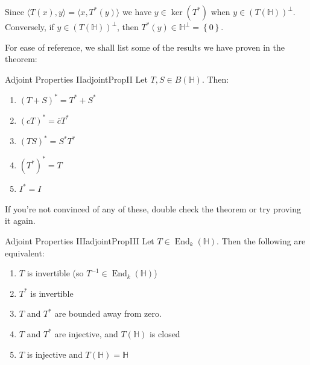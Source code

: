 \documentclass[oneside]{book}
\renewcommand{\H}{\mathbb{H}}
\newcommand{\oln}{\overline}
\newcommand{\End}{\operatorname{End}}
\begin{document}
\begin{Proof}
	Since $ \langle T(x), y \rangle = \langle x, T^*(y) \rangle$ we have $y \in \ker(T^*)$ when $y \in
	(T(\H))^\perp$. Conversely, if $y \in (T(\H))^\perp$, then $T^*(y) \in \H^\perp = \left\{ 0 \right\}$.
\end{Proof}

For ease of reference, we shall list some of the results we have proven in the theorem:
\begin{prop}{Adjoint Properties II}{adjointPropII}
	Let $T,S \in B(\H)$. Then:
	\begin{enumerate}
		\item $(T+S)^* = T^*+S^*$
		\item $(cT)^* = \oln{c}T^*$
		\item $(TS)^* = S^*T^*$
		\item $(T^*)^* = T$
		\item $I^* = I$
	\end{enumerate}
\end{prop}

\begin{Proof}
	If you're not convinced of any of these, double check the theorem or try proving it again.
\end{Proof}

\begin{prop}{Adjoint Properties III}{adjointPropIII}
	Let $T \in \End_k(\H)$. Then the following are equivalent:
	\begin{enumerate}
		\item $T$ is invertible (so $T^{-1} \in \End_k(\H)$)
		\item $T^*$ is invertible
		\item $T$ and $T^*$ are bounded away from zero.
		\item $T$ and $T^*$ are injective, and $T(\H)$ is closed
		\item $T$ is injective and $T(\H) = \H$
	\end{enumerate}
\end{prop}
\end{document}
